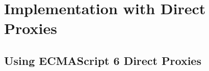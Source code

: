 \chapter{Implementation with Direct Proxies} \label{chapter:IMPLEMENTATION}

% 
% 


\section{Using ECMAScript 6 Direct Proxies}




